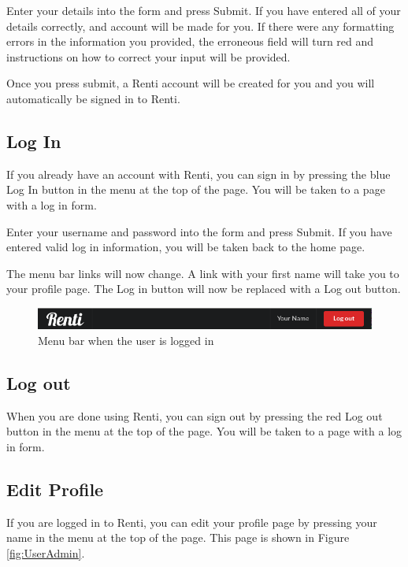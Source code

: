 \documentclass{article}
\begin{document}
Enter your details into the form and press Submit. If you have entered all of your details correctly, and account will be made for you. If there were any formatting errors in the information you provided, the erroneous field will turn red and instructions on how to correct your input will be provided.

Once you press submit, a Renti account will be created for you and you will automatically be signed in to Renti.

\subsection{Log In}
If you already have an account with Renti, you can sign in by pressing the blue Log In button in the menu at the top of the page. You will be taken to a page with a log in form.

Enter your username and password into the form and press Submit. If you have entered valid log in information, you will be taken back to the home page.

The menu bar links will now change. A link with your first name will take you to your profile page. The Log in button will now be replaced with a Log out button.

\begin{figure}[ht!]
    \centering
    \includegraphics[keepaspectratio, width=\textwidth]{menubarloggedin}
    \caption{Menu bar when the user is logged in}
    \label{fig:menubarloggedin}
\end{figure}

\subsection{Log out}
When you are done using Renti, you can sign out by pressing the red Log out button in the menu at the top of the page. You will be taken to a page with a log in form.

\subsection{Edit Profile}
If you are logged in to Renti, you can edit your profile page by pressing your name in the menu at the top of the page. This page is shown in Figure \ref{fig:UserAdmin}.
\end{document}
